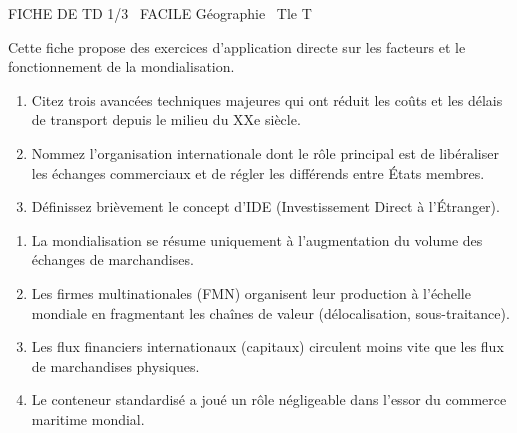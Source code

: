 \documentclass[11pt]{article}
\begin{document}
\begin{tcolorbox}[enhanced,colback=popink,colframe=popink,arc=10pt,boxrule=0pt,left=12pt,right=12pt,top=9pt,bottom=9pt]
{\color{white}\popxbold\small FICHE DE TD 1/3 \textbullet\ FACILE \hfill Géographie \textbullet\ Tle T\par}
\end{tcolorbox}
\vspace{4pt}
Cette fiche propose des exercices d'application directe sur les facteurs et le fonctionnement de la mondialisation.

\begin{exercice}
\begin{enumerate}
    \item Citez trois avancées techniques majeures qui ont réduit les coûts et les délais de transport depuis le milieu du XXe siècle.
    \item Nommez l'organisation internationale dont le rôle principal est de libéraliser les échanges commerciaux et de régler les différends entre États membres.
    \item Définissez brièvement le concept d'\og IDE \fg{} (Investissement Direct à l'Étranger).
\end{enumerate}
\end{exercice}

\begin{exercice}
\begin{enumerate}
    \item La mondialisation se résume uniquement à l'augmentation du volume des échanges de marchandises.
    \item Les firmes multinationales (FMN) organisent leur production à l'échelle mondiale en fragmentant les chaînes de valeur (délocalisation, sous-traitance).
    \item Les flux financiers internationaux (capitaux) circulent moins vite que les flux de marchandises physiques.
    \item Le conteneur standardisé a joué un rôle négligeable dans l'essor du commerce maritime mondial.
\end{enumerate}
\end{exercice}
\end{document}
